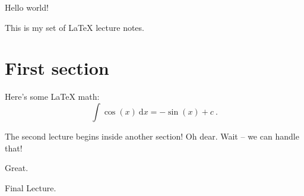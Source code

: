 Hello world!

This is my set of LaTeX lecture notes.

\section{First section}

Here's some LaTeX math:
$$
    \int \cos(x) ~ \mathrm{d} x = - \sin(x) + c~.
$$



The second lecture begins inside another section! Oh dear. Wait -- we can handle that!

Great.


Final Lecture.

